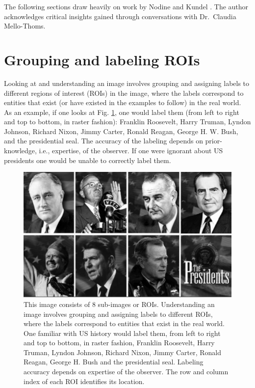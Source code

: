 \documentclass[
]{book}
\begin{document}
The following sections draw heavily on work by Nodine and Kundel \citep{nodine1987using, kundel2007holistic, kundel2004modeling, kundel1983visual, kundel1978visual}. The author acknowledges critical insights gained through conversations with Dr.~Claudia Mello-Thoms.

\hypertarget{visual-search-grouping-labeling-rois}{%
\section{Grouping and labeling ROIs}\label{visual-search-grouping-labeling-rois}}

Looking at and understanding an image involves grouping and assigning labels to different regions of interest (ROIs) in the image, where the labels correspond to entities that exist (or have existed in the examples to follow) in the real world. As an example, if one looks at Fig. \ref{fig:visual-search-us-presidents}, one would label them (from left to right and top to bottom, in raster fashion): Franklin Roosevelt, Harry Truman, Lyndon Johnson, Richard Nixon, Jimmy Carter, Ronald Reagan, George H. W. Bush, and the presidential seal. The accuracy of the labeling depends on prior-knowledge, i.e., expertise, of the observer. If one were ignorant about US presidents one would be unable to correctly label them.

\begin{figure}

{\centering \includegraphics{images/15-visual-search/usPresidents} 

}

\caption{This image consists of 8 sub-images or ROIs. Understanding an image involves grouping and assigning labels to different ROIs, where the labels correspond to entities that exist in the real world. One familiar with US history would label them, from left to right and top to bottom, in raster fashion, Franklin Roosevelt, Harry Truman, Lyndon Johnson, Richard Nixon, Jimmy Carter, Ronald Reagan, George H. Bush and the presidential seal. Labeling accuracy depends on expertise of the observer. The row and column index of each ROI identifies its location.}\label{fig:visual-search-us-presidents}
\end{figure}
\end{document}
